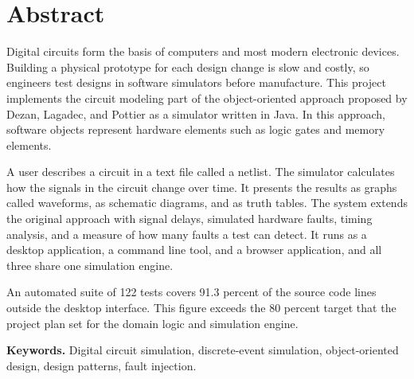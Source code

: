 \section*{Abstract}

Digital circuits form the basis of computers and most modern electronic devices.
Building a physical prototype for each design change is slow and costly, so engineers test designs in software simulators before manufacture.
This project implements the circuit modeling part of the object-oriented approach proposed by Dezan, Lagadec, and Pottier as a simulator written in Java.
In this approach, software objects represent hardware elements such as logic gates and memory elements.

A user describes a circuit in a text file called a netlist.
The simulator calculates how the signals in the circuit change over time.
It presents the results as graphs called waveforms, as schematic diagrams, and as truth tables.
The system extends the original approach with signal delays, simulated hardware faults, timing analysis, and a measure of how many faults a test can detect.
It runs as a desktop application, a command line tool, and a browser application, and all three share one simulation engine.

An automated suite of 122 tests covers 91.3 percent of the source code lines outside the desktop interface.
This figure exceeds the 80 percent target that the project plan set for the domain logic and simulation engine.

\vspace{6pt}
\textbf{Keywords.} Digital circuit simulation, discrete-event simulation, object-oriented design, design patterns, fault injection.

